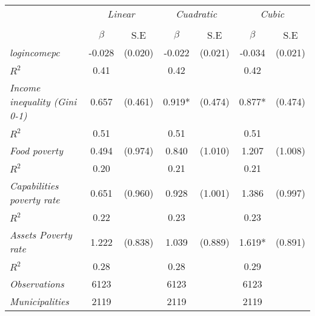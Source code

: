 


\begin{tabular}{lcccccc}


\hline
\hline

\multicolumn{1}{l}{} & \multicolumn{2}{c}{\textit{Linear}} & \multicolumn{2}{c}{\textit{Cuadratic}} & \multicolumn{2}{c}{\textit{Cubic}}   \\ 

\cmidrule(l{1mm}r{1mm}){2-3} \cmidrule(l{1mm}r{1mm}){4-5} \cmidrule(l{1mm}r{1mm}){6-7}   \\
& $\beta$ & S.E & $\beta$ & S.E & $\beta$ & S.E \\
\hline


\textit{logincomepc}    &  -0.028    & (0.020)      &   -0.022        &  (0.021)      &     -0.034  &    (0.021)   \\
$R^{2}$			         &  0.41   & 	   &     0.42   	&		 &     0.42   &  \\
					
\textit{Income inequality (Gini 0-1)}    &  0.657    & (0.461)      &   0.919*        &  (0.474)      &     0.877*  &    (0.474)  \\
$R^{2}$			         &  0.51   & 	   &     0.51   	&		 &     0.51   &  \\
					
\textit{Food poverty}    &  0.494    & (0.974)      &   0.840        &  (1.010)      &     1.207  &    (1.008)  \\
$R^{2}$			         &  0.20   & 	   &     0.21   	&		 &     0.21   &   \\
					
\textit{Capabilities poverty rate}    &  0.651    & (0.960)      &   0.928        &  (1.001)      &     1.386  &    (0.997)  \\
$R^{2}$			         &  0.22   & 	   &     0.23   	&		 &     0.23   &  \\
					
\textit{Assets Poverty rate}    &  1.222    & (0.838)      &   1.039        &  (0.889)      &     1.619*  &    (0.891)  \\
$R^{2}$			         &  0.28   & 	   &     0.28   	&		 &     0.29   &   \\


\hline		

\textit{Observations}              &   6123    &  & 6123    &  &  6123   &  		\\
\textit{Municipalities}               &   2119   &  & 2119   &  &  2119  &  		\\


\end{tabular}%
